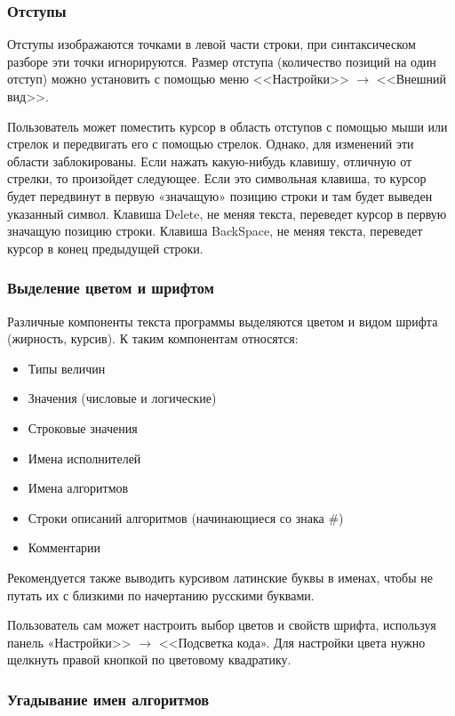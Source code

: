 \documentclass[12pt,a4paper]{article}
\begin{document}
\subsubsection{Отступы}

Отступы изображаются точками в левой части строки, при синтаксическом разборе эти точки игнорируются. Размер отступа (количество позиций на один отступ) можно установить с помощью меню <<Настройки>> $\to$ <<Внешний вид>>.

Пользователь может поместить курсор в область отступов с помощью мыши или стрелок и передвигать его с помощью стрелок. Однако, для изменений эти области заблокированы. Если нажать какую-нибудь клавишу, отличную от стрелки, то произойдет следующее. Если это символьная клавиша, то курсор будет передвинут в первую «значащую» позицию строки и там будет выведен указанный символ. Клавиша \textsf{Delete}, не меняя текста,  переведет курсор в первую значащую позицию строки. Клавиша \textsf{BackSpace}, не меняя текста,  переведет курсор в конец предыдущей строки.

\subsubsection{Выделение цветом и шрифтом}
\label{highlight}

Различные компоненты текста программы выделяются цветом и видом шрифта (жирность, курсив). К таким компонентам относятся:
\begin{itemize}
\item		Типы величин
\item		Значения (числовые и логические)
\item		Строковые значения
\item		Имена исполнителей
\item		Имена алгоритмов
\item		Строки описаний алгоритмов (начинающиеся со знака \#)
\item		Комментарии
\end{itemize}

Рекомендуется также выводить курсивом латинские буквы в именах, чтобы не путать их с близкими по начертанию русскими буквами.

Пользователь сам может настроить выбор цветов и свойств шрифта, используя панель «Настройки>> $\to$ <<Подсветка кода». Для настройки цвета нужно щелкнуть правой кнопкой по цветовому квадратику.

\subsubsection{Угадывание имен алгоритмов}
\end{document}
